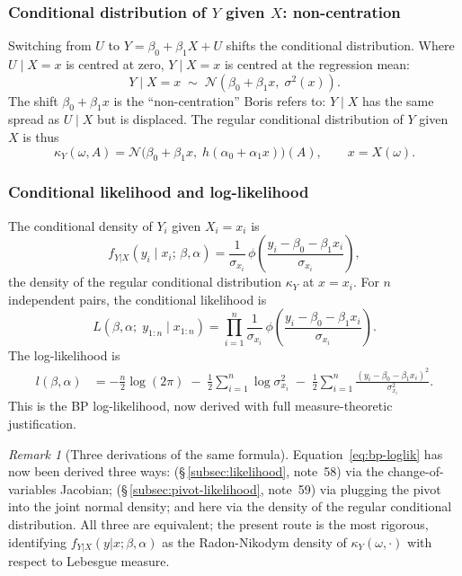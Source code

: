 \documentclass[a4paper,oneside,12pt]{extarticle}
\theoremstyle{plain}
\theoremstyle{definition}
\theoremstyle{remark}
\newtheorem{remark}[proposition]{Remark}
\begin{document}
\subsubsection*{Conditional distribution of $Y$ given $X$: non-centration}

Switching from $U$ to $Y = \beta_0 + \beta_1 X + U$ shifts the
conditional distribution.  Where $U \mid X = x$ is centred at zero,
$Y \mid X = x$ is centred at the regression mean:
\[
  Y \mid X = x \;\sim\; \mathcal{N}(\beta_0 + \beta_1 x,\;\sigma^2(x)).
\]
The shift $\beta_0 + \beta_1 x$ is the ``non-centration'' Boris
refers to: $Y\mid X$ has the same spread as $U\mid X$ but is
displaced.  The regular conditional distribution of $Y$ given $X$
is thus
\[
  \kappa_Y(\omega, A)
  = \mathcal{N}\!\bigl(\beta_0 + \beta_1 x,\; h(\alpha_0 + \alpha_1 x)\bigr)(A),
  \qquad x = X(\omega).
\]

\subsubsection*{Conditional likelihood and log-likelihood}

The conditional density of $Y_i$ given $X_i = x_i$ is
\[
  f_{Y|X}(y_i \mid x_i;\,\beta,\alpha)
  = \frac{1}{\sigma_{x_i}}\,
    \phi\!\left(\frac{y_i - \beta_0 - \beta_1 x_i}{\sigma_{x_i}}\right),
\]
the density of the regular conditional distribution $\kappa_Y$ at
$x = x_i$.  For $n$ independent pairs, the conditional likelihood is
\[
  L(\beta, \alpha;\; y_{1:n} \mid x_{1:n})
  = \prod_{i=1}^n \frac{1}{\sigma_{x_i}}\,
    \phi\!\left(\frac{y_i - \beta_0 - \beta_1 x_i}{\sigma_{x_i}}\right).
\]
The log-likelihood is
\begin{align}
  l(\beta, \alpha)
  &= -\frac{n}{2}\log(2\pi)
    \;-\; \frac{1}{2}\sum_{i=1}^n \log\sigma_{x_i}^2
    \;-\; \frac{1}{2}\sum_{i=1}^n
          \frac{(y_i - \beta_0 - \beta_1 x_i)^2}{\sigma_{x_i}^2}.
  \label{eq:bp-loglik}
\end{align}
This is the BP log-likelihood, now derived with full measure-theoretic
justification.

\begin{remark}[Three derivations of the same formula]
Equation~\eqref{eq:bp-loglik} has now been derived three ways:
(§\,\ref{subsec:likelihood}, note~58) via the change-of-variables
Jacobian; (§\,\ref{subsec:pivot-likelihood}, note~59) via plugging
the pivot into the joint normal density; and here via the density of
the regular conditional distribution.  All three are equivalent;
the present route is the most rigorous, identifying
$f_{Y|X}(y|x;\beta,\alpha)$ as the Radon-Nikodym density of
$\kappa_Y(\omega, \cdot)$ with respect to Lebesgue measure.
\end{remark}
\end{document}

